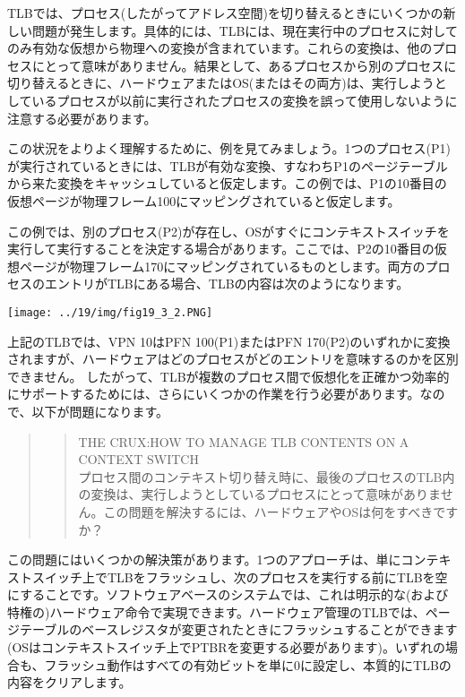 TLBでは、プロセス(したがってアドレス空間)を切り替えるときにいくつかの新しい問題が発生します。具体的には、TLBには、現在実行中のプロセスに対してのみ有効な仮想から物理への変換が含まれています。これらの変換は、他のプロセスにとって意味がありません。結果として、あるプロセスから別のプロセスに切り替えるときに、ハードウェアまたはOS(またはその両方)は、実行しようとしているプロセスが以前に実行されたプロセスの変換を誤って使用しないように注意する必要があります。

この状況をよりよく理解するために、例を見てみましょう。1つのプロセス(P1)が実行されているときには、TLBが有効な変換、すなわちP1のページテーブルから来た変換をキャッシュしていると仮定します。この例では、P1の10番目の仮想ページが物理フレーム100にマッピングされていると仮定します。

この例では、別のプロセス(P2)が存在し、OSがすぐにコンテキストスイッチを実行して実行することを決定する場合があります。ここでは、P2の10番目の仮想ページが物理フレーム170にマッピングされているものとします。両方のプロセスのエントリがTLBにある場合、TLBの内容は次のようになります。

\texttt{[image: ../19/img/fig19\_3\_2.PNG]}

上記のTLBでは、VPN 10はPFN 100(P1)またはPFN
170(P2)のいずれかに変換されますが、ハードウェアはどのプロセスがどのエントリを意味するのかを区別できません。
したがって、TLBが複数のプロセス間で仮想化を正確かつ効率的にサポートするためには、さらにいくつかの作業を行う必要があります。なので、以下が問題になります。

\begin{quote}
\begin{quote}
THE CRUX:HOW TO MANAGE TLB CONTENTS ON A CONTEXT SWITCH\\
プロセス間のコンテキスト切り替え時に、最後のプロセスのTLB内の変換は、実行しようとしているプロセスにとって意味がありません。この問題を解決するには、ハードウェアやOSは何をすべきですか？
\end{quote}
\end{quote}

この問題にはいくつかの解決策があります。1つのアプローチは、単にコンテキストスイッチ上でTLBをフラッシュし、次のプロセスを実行する前にTLBを空にすることです。ソフトウェアベースのシステムでは、これは明示的な(および特権の)ハードウェア命令で実現できます。ハードウェア管理のTLBでは、ページテーブルのベースレジスタが変更されたときにフラッシュすることができます(OSはコンテキストスイッチ上でPTBRを変更する必要があります)。いずれの場合も、フラッシュ動作はすべての有効ビットを単に0に設定し、本質的にTLBの内容をクリアします。

